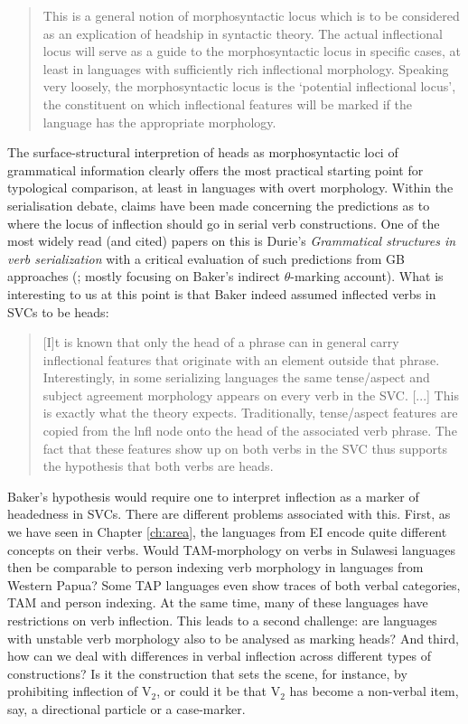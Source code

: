 \begin{quote}
This is a general notion of morphosyntactic locus which is to be considered as an explication of headship in syntactic theory. The actual inflectional locus will serve as a guide to the morphosyntactic locus in specific cases, at least in languages with sufficiently rich inflectional morphology. Speaking very loosely, the morphosyntactic locus is the `potential inflectional locus', the constituent on which inflectional features will be marked if the language has the appropriate morphology. \citep[6]{zwicky1985heads1}
\end{quote}

The surface-structural interpretion of heads as morphosyntactic loci of grammatical information clearly offers the most practical starting point for typological comparison, at least in languages with overt morphology. Within the serialisation debate, claims have been made concerning the predictions as to where the locus of inflection should go in serial verb constructions. One of the most widely read (and cited) papers on this is Durie's \textit{Grammatical structures in verb serialization} with a critical evaluation of such predictions from GB approaches (\citealt{Durie1997}; mostly focusing on Baker's indirect $\theta$-marking account). What is interesting to us at this point is that Baker indeed assumed inflected verbs in SVCs to be heads:

\begin{quote}[I]t is known that only the head of a phrase can in general carry inflectional features that originate with an element outside that phrase. Interestingly, in some serializing languages the same tense/aspect and subject agreement morphology appears on every verb in the SVC. [...]  This is exactly what the theory expects. Traditionally, tense/aspect features are copied from the lnfl node onto the head of the associated verb phrase. The fact that these features show up on both verbs in the SVC thus supports the hypothesis that both verbs are heads. \citep[523f.]{baker1989object}
 \end{quote}
 
Baker's hypothesis would require one to interpret inflection as a marker of headedness in SVCs. There are different problems associated with this. First, as we have seen in Chapter \ref{ch:area}, the languages from EI encode quite different concepts on their verbs. Would TAM-morphology on verbs in Sulawesi languages then be comparable to person indexing verb morphology in languages from Western Papua? Some TAP languages even show traces of both verbal categories, TAM and person indexing. At the same time, many of these languages have restrictions on verb inflection. This leads to a second challenge: are languages with unstable verb morphology also to be analysed as marking heads? And third, how can we deal with differences in verbal inflection across different types of constructions? Is it the construction that sets the scene, for instance, by prohibiting inflection of V$_2$, or could it be that V$_2$ has become a non-verbal item, say, a directional particle or a case-marker.

